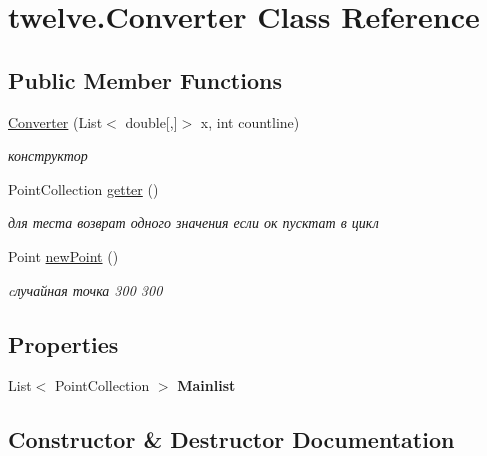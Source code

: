 \hypertarget{classtwelve_1_1_converter}{}\section{twelve.\+Converter Class Reference}
\label{classtwelve_1_1_converter}
\subsection*{Public Member Functions}
\begin{DoxyCompactItemize}
\item 
\hyperlink{classtwelve_1_1_converter_a31ab9582580f65284b4bf6e1fcaf60ca}{Converter} (List$<$ double\mbox{[},\mbox{]}$>$ x, int countline)
\begin{DoxyCompactList}\small\item\em конструктор \end{DoxyCompactList}\item 
Point\+Collection \hyperlink{classtwelve_1_1_converter_a409dedc4a6b066fc0436177266741f99}{getter} ()
\begin{DoxyCompactList}\small\item\em для теста возврат одного значения если ок пусктат в цикл \end{DoxyCompactList}\item 
Point \hyperlink{classtwelve_1_1_converter_a3ece4057a593a4f06bc03dca8dde0cd6}{new\+Point} ()
\begin{DoxyCompactList}\small\item\em cлучайная точка 300 300 \end{DoxyCompactList}\end{DoxyCompactItemize}
\subsection*{Properties}
\begin{DoxyCompactItemize}
\item 
\hypertarget{classtwelve_1_1_converter_abf8b77f35313aa45f084523dbd4f3c92}{}List$<$ Point\+Collection $>$ {\bfseries Mainlist}\label{classtwelve_1_1_converter_abf8b77f35313aa45f084523dbd4f3c92}

\end{DoxyCompactItemize}


\subsection{Constructor \& Destructor Documentation}
\hypertarget{classtwelve_1_1_converter_a31ab9582580f65284b4bf6e1fcaf60ca}{}
